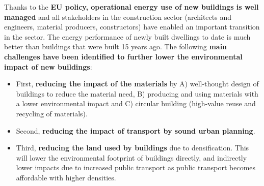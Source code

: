 \documentclass[../summary.tex]{subfiles}
\begin{document}
	Thanks to the \textbf{EU policy, operational energy use of new buildings is well managed} and all stakeholders in the construction sector (architects and engineers, material producers, constructors) have enabled an important transition in the sector. The energy performance of newly built dwellings to date is much better than buildings that were built 15 years ago. The following \textbf{main challenges have been identified to further lower the environmental impact of new buildings}:
	\begin{itemize}
		\item First, \textbf{reducing the impact of the materials} by A) well-thought design of buildings to reduce the material need, B) producing and using materials with a lower environmental impact and C) circular building (high-value reuse and recycling of materials).
		\item Second, \textbf{reducing the impact of transport by sound urban planning}.
		\item Third, \textbf{reducing the land used by buildings} due to densification. This will lower the environmental footprint of buildings directly, and indirectly lower impacts due to increased public transport as public transport becomes affordable with higher densities.
	\end{itemize}
	
\end{document}
